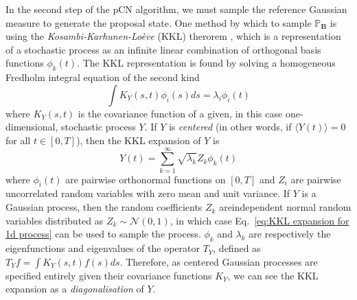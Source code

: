 In the second step of the pCN algorithm, we must sample the reference Gaussian measure to generate the proposal state. One method by which to sample $\mathbb{P}_\mathbf{B}$ is using the \textit{Kosambi-Karhunen-Lo\`eve} (KKL) therorem \citep{kosambiParallelismPathspaces2016, karhunenUeberLineareMethoden1947, loeveProbabilityTheory1977a}, which is a representation of a stochastic process as an infinite linear combination of orthogonal basis functions $\phi_k(t)$. The KKL representation is found by solving a homogeneous Fredholm integral equation of the second kind
\begin{equation} \label{eq:fredholm eq for KKL}
	\int K_Y(s, t) \phi_i(s) ds = \lambda_i \phi_i(t)
\end{equation}
where $K_Y(s,t)$ is the covariance function of a given, in this case one-dimensional, stochastic process $Y$. If $Y$ is \textit{centered} (in other words, if $\langle Y(t) \rangle = 0$ for all $t \in [0, T]$), then the KKL expansion of $Y$ is
\begin{equation} \label{eq:KKL expansion for 1d process}
	Y(t) = \sum_{k=1}^\infty \sqrt{\lambda_k} Z_k \phi_k(t)
\end{equation}
where $\phi_i(t)$ are pairwise orthonormal functions on $[0, T]$ and $Z_i$ are pairwise uncorrelated random variables with zero mean and unit variance. If $Y$ is a Gaussian process, then the random coefficients $Z_k$ areindependent normal random variables distributed as $Z_k \sim \mathcal{N}(0, 1)$, in which case Eq.~\ref{eq:KKL expansion for 1d process} can be used to sample the process. $\phi_k$ and $\lambda_k$ are respectively the eigenfunctions and eigenvalues of the operator $T_Y$, defined as $T_Y f = \int K_Y(s, t) f(s) ds$. Therefore, as centered Gaussian processes are specified entirely given their covariance functions $K_Y$, we can see the KKL expansion as a \textit{diagonalisation} of $Y$.

